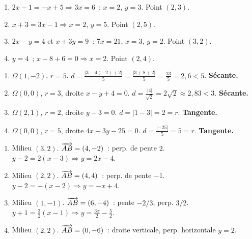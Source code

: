 \begin{enumerate}
  \item $2x-1=-x+5\Rightarrow3x=6$~: $x=2$, $y=3$. Point $(2,3)$.
  \item $x+3=3x-1\Rightarrow x=2$, $y=5$. Point $(2,5)$.
  \item $2x-y=4$ et $x+3y=9$~: $7x=21$, $x=3$, $y=2$. Point $(3,2)$.
  \item $y=4$~; $x-8+6=0\Rightarrow x=2$. Point $(2,4)$.
\end{enumerate}


\begin{enumerate}
  \item $\Omega(1,-2)$, $r=5$. $d=\frac{|3-4(-2)+2|}{5}=\frac{|3+8+2|}{5}=\frac{13}{5}=2{,}6<5$.
        \textbf{S\'ecante.}
  \item $\Omega(0,0)$, $r=3$, droite $x-y+4=0$.
        $d=\frac{|4|}{\sqrt{2}}=2\sqrt{2}\approx2{,}83<3$. \textbf{S\'ecante.}
  \item $\Omega(2,1)$, $r=2$, droite $y-3=0$.
        $d=|1-3|=2=r$. \textbf{Tangente.}
  \item $\Omega(0,0)$, $r=5$, droite $4x+3y-25=0$.
        $d=\frac{|{-25}|}{5}=5=r$. \textbf{Tangente.}
\end{enumerate}


\begin{enumerate}
  \item Milieu $(3,2)$. $\overrightarrow{AB}=(4,-2)$~: perp. de pente $2$.
        $y-2=2(x-3)\Rightarrow y=2x-4$.
  \item Milieu $(2,2)$. $\overrightarrow{AB}=(4,4)$~: perp. de pente $-1$.
        $y-2=-(x-2)\Rightarrow y=-x+4$.
  \item Milieu $(1,-1)$. $\overrightarrow{AB}=(6,-4)$~: pente $-2/3$, perp. $3/2$.
        $y+1=\frac{3}{2}(x-1)\Rightarrow y=\frac{3x}{2}-\frac{5}{2}$.
  \item Milieu $(2,2)$. $\overrightarrow{AB}=(0,-6)$~: droite verticale, perp. horizontale $y=2$.
\end{enumerate}


